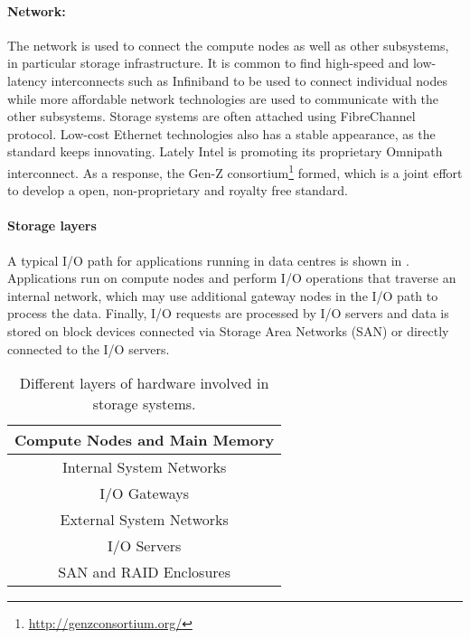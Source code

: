 \paragraph{Network:}
The network is used to connect the compute nodes as well as other subsystems, in particular storage infrastructure.
It is common to find high-speed and low-latency interconnects such as Infiniband to be used to connect individual nodes while
more affordable network technologies are used to communicate with the other subsystems. Storage systems are often attached
using FibreChannel protocol. Low-cost Ethernet technologies also has a stable appearance, as the standard keeps innovating.
Lately Intel is promoting its proprietary Omnipath interconnect. As a response, the Gen-Z consortium\footnote{\url{http://genzconsortium.org/}} formed, which is a joint
effort to develop a open, non-proprietary and royalty free standard.

\paragraph{Storage layers}
A typical I/O path for applications running in data centres is shown in .
Applications run on compute nodes and perform I/O operations that traverse an internal network,
which may use additional gateway nodes in the I/O path to process the data.
Finally, I/O requests are processed by I/O servers and data is stored on block devices connected via Storage Area Networks (SAN) or directly connected to the I/O servers.

\begin{table}[]
	\small
	\centering

	\bgroup
	\def\arraystretch{1.5}%
	\begin{tabular}{ | c | }
		\hline
		Compute Nodes and Main Memory\\ \hline
		Internal System Networks\\ \hline
		I/O Gateways\\ \hline
		External System Networks\\ \hline
		I/O Servers \\ \hline
		SAN and RAID Enclosures\\
		\hline
	\end{tabular}
	\egroup

	\caption{Different layers of hardware involved in storage systems.}
	\label{tab:storage layers}
\end{table}


